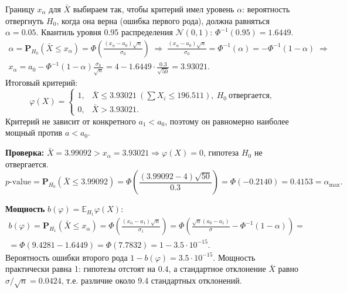 \documentclass[12pt]{spbstu-task}
\newcommand{\E}{\mathbb{E}}
\renewcommand{\Prob}{\mathbf{P}}
\begin{document}
Границу \(x_\alpha\) для \(\bar{X}\) выбираем так, чтобы критерий имел уровень \(\alpha\): вероятность отвергнуть \(H_0\), когда она верна
(ошибка первого рода), должна равняться \(\alpha = 0.05\). Квантиль уровня 0.95 распределения \(\mathcal{N}(0, 1)\):
\(\Phi^{-1}(0.95) = 1.6449\).
\begin{gather*}
  \alpha = \Prob_{H_0}\left(\bar{X} \le x_\alpha\right) = \Phi\left(\frac{(x_\alpha - a_0)\sqrt{n}}{\sigma_0}\right)
  \;\Rightarrow\;
  \frac{(x_\alpha - a_0)\sqrt{n}}{\sigma_0} = \Phi^{-1}(\alpha) = -\Phi^{-1}(1 - \alpha)
  \;\Rightarrow\\
  x_\alpha = a_0 - \Phi^{-1}(1 - \alpha)\frac{\sigma_0}{\sqrt{n}} = 4 - 1.6449\cdot\frac{0.3}{\sqrt{50}} = 3.93021.
\end{gather*}
Итоговый критерий:
\begin{displaymath}
  \varphi(X) =
  \begin{cases}
    1, & \bar{X} \le 3.93021\ \left(\sum X_i \le 196.511\right),\ H_0\ \text{отвергается},\\
    0, & \bar{X} > 3.93021.
  \end{cases}
\end{displaymath}
Критерий не зависит от конкретного \(a_1 < a_0\), поэтому он равномерно наиболее мощный против \(a < a_0\).

\textbf{Проверка:} \(\bar{X} = 3.99092 > x_\alpha = 3.93021 \Rightarrow \varphi(X) = 0\), гипотеза \(H_0\) не отвергается.
\begin{displaymath}
  p\text{-value} = \Prob_{H_0}\left(\bar{X} \le 3.99092\right) = \Phi\left(\frac{(3.99092 - 4)\sqrt{50}}{0.3}\right)
  = \Phi(-0.2140) = 0.4153 = \alpha_{\max}.
\end{displaymath}

\textbf{Мощность} \(b(\varphi) = \E_{H_1}\varphi(X)\):
\begin{gather*}
  b(\varphi) = \Prob_{H_1}\left(\bar{X} \le x_\alpha\right) = \Phi\left(\frac{(x_\alpha - a_1)\sqrt{n}}{\sigma_1}\right)
  = \Phi\left(\frac{\sqrt{n}(a_0 - a_1)}{\sigma} - \Phi^{-1}(1 - \alpha)\right) =\\
  = \Phi(9.4281 - 1.6449) = \Phi(7.7832) = 1 - 3.5\cdot 10^{-15}.
\end{gather*}
Вероятность ошибки второго рода \(1 - b(\varphi) = 3.5\cdot 10^{-15}\). Мощность практически равна 1:
гипотезы отстоят на \(0.4\), а стандартное отклонение \(\bar{X}\) равно \(\sigma/\sqrt{n} = 0.0424\),
т.е. различие около 9.4 стандартных отклонений.
\end{document}

